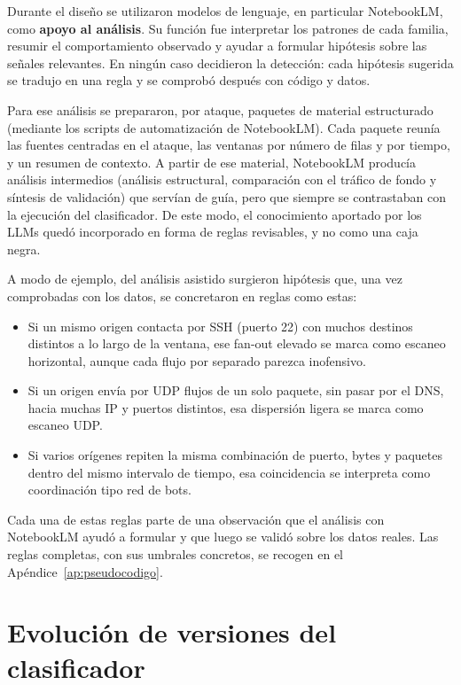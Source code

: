 Durante el diseño se utilizaron modelos de lenguaje, en particular NotebookLM, como \textbf{apoyo al análisis}. Su función fue interpretar los patrones de cada familia, resumir el comportamiento observado y ayudar a formular hipótesis sobre las señales relevantes. En ningún caso decidieron la detección: cada hipótesis sugerida se tradujo en una regla y se comprobó después con código y datos.

Para ese análisis se prepararon, por ataque, paquetes de material estructurado (mediante los scripts de automatización de NotebookLM). Cada paquete reunía las fuentes centradas en el ataque, las ventanas por número de filas y por tiempo, y un resumen de contexto. A partir de ese material, NotebookLM producía análisis intermedios (análisis estructural, comparación con el tráfico de fondo y síntesis de validación) que servían de guía, pero que siempre se contrastaban con la ejecución del clasificador. De este modo, el conocimiento aportado por los LLMs quedó incorporado en forma de reglas revisables, y no como una caja negra.

A modo de ejemplo, del análisis asistido surgieron hipótesis que, una vez comprobadas con los datos, se concretaron en reglas como estas:

\begin{itemize}
  \item Si un mismo origen contacta por SSH (puerto 22) con muchos destinos distintos a lo largo de la ventana, ese fan-out elevado se marca como escaneo horizontal, aunque cada flujo por separado parezca inofensivo.
  \item Si un origen envía por UDP flujos de un solo paquete, sin pasar por el DNS, hacia muchas IP y puertos distintos, esa dispersión ligera se marca como escaneo UDP.
  \item Si varios orígenes repiten la misma combinación de puerto, bytes y paquetes dentro del mismo intervalo de tiempo, esa coincidencia se interpreta como coordinación tipo red de bots.
\end{itemize}

Cada una de estas reglas parte de una observación que el análisis con NotebookLM ayudó a formular y que luego se validó sobre los datos reales. Las reglas completas, con sus umbrales concretos, se recogen en el Apéndice~\ref{ap:pseudocodigo}.

\section{Evolución de versiones del clasificador}
\label{sec:alg_versiones}


